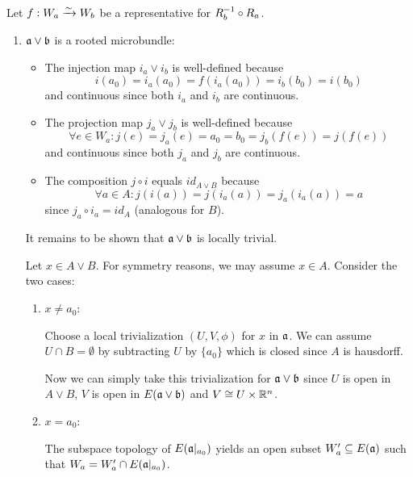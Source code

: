 \begin{myproof}
    Let $f: W_a \xrightarrow{\sim} W_b$ be a representative for $R_b^{-1} \circ R_a$.
    \begin{enumerate}
        \item $\ba \vee \bb$ is a rooted microbundle:
        \begin{itemize}
            \item The injection map $i_a \vee i_b$ is well-defined because 
            \[ i(a_0) = i_a(a_0) = f(i_a(a_0)) = i_b(b_0) = i(b_0) \]
            and continuous since both $i_a$ and $i_b$ are continuous.
            \item The projection map $j_a \vee j_b$ is well-defined because
            \[ \forall e \in W_a: j(e) = j_a(e) = a_0 = b_0 = j_b(f(e)) = j(f(e)) \]
            and continuous since both $j_a$ and $j_b$ are continuous.
            \item The composition $j \circ i$ equals $id_{A \vee B}$ because
            \[ \forall a \in A: j(i(a)) = j(i_a(a)) = j_a(i_a(a)) = a \]
            since $j_a \circ i_a = id_A$ (analogous for $B$).
        \end{itemize}
        It remains to be shown that $\ba \vee \bb$ is locally trivial.

        Let $x \in A \vee B$.
        For symmetry reasons, we may assume $x \in A$.
        Consider the two cases:
        \begin{enumerate}
            \item $x \neq a_0$:
            
            Choose a local trivialization $(U, V, \phi)$ for $x$ in $\mathfrak{a}$.
            We can assume $U \cap B = \emptyset$ by subtracting $U$ by $\{a_0\}$ which is closed since $A$ is hausdorff.
            
            Now we can simply take this trivialization for $\ba \vee \bb$
            since $U$ is open in $A \vee B$, $V$ is open in $E(\ba \vee \bb)$ and $V \cong U \times \mathbb{R}^n$.
            \item $x = a_0$:
            
            The subspace topology of $E(\mathfrak{a}\vert_{a_0})$ yields an open subset
            $W_a' \subseteq{} E(\mathfrak{a})$ such that $W_a = W_a' \cap E(\mathfrak{a}\vert_{a_0})$.
    

\end{enumerate}
\end{enumerate}
\end{myproof}
